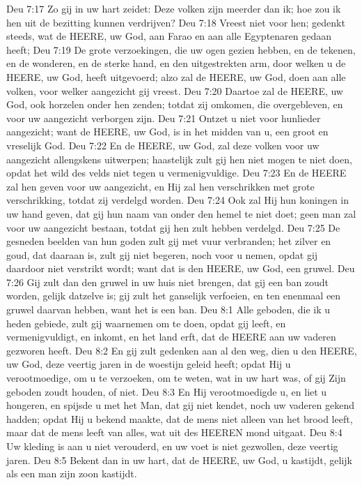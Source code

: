 Deu 7:17  Zo gij in uw hart zeidet: Deze volken zijn meerder dan ik; hoe zou ik hen uit de bezitting kunnen verdrijven?
Deu 7:18  Vreest niet voor hen; gedenkt steeds, wat de HEERE, uw God, aan Farao en aan alle Egyptenaren gedaan heeft;
Deu 7:19  De grote verzoekingen, die uw ogen gezien hebben, en de tekenen, en de wonderen, en de sterke hand, en den uitgestrekten arm, door welken u de HEERE, uw God, heeft uitgevoerd; alzo zal de HEERE, uw God, doen aan alle volken, voor welker aangezicht gij vreest.
Deu 7:20  Daartoe zal de HEERE, uw God, ook horzelen onder hen zenden; totdat zij omkomen, die overgebleven, en voor uw aangezicht verborgen zijn.
Deu 7:21  Ontzet u niet voor hunlieder aangezicht; want de HEERE, uw God, is in het midden van u, een groot en vreselijk God.
Deu 7:22  En de HEERE, uw God, zal deze volken voor uw aangezicht allengskens uitwerpen; haastelijk zult gij hen niet mogen te niet doen, opdat het wild des velds niet tegen u vermenigvuldige.
Deu 7:23  En de HEERE zal hen geven voor uw aangezicht, en Hij zal hen verschrikken met grote verschrikking, totdat zij verdelgd worden.
Deu 7:24  Ook zal Hij hun koningen in uw hand geven, dat gij hun naam van onder den hemel te niet doet; geen man zal voor uw aangezicht bestaan, totdat gij hen zult hebben verdelgd.
Deu 7:25  De gesneden beelden van hun goden zult gij met vuur verbranden; het zilver en goud, dat daaraan is, zult gij niet begeren, noch voor u nemen, opdat gij daardoor niet verstrikt wordt; want dat is den HEERE, uw God, een gruwel.
Deu 7:26  Gij zult dan den gruwel in uw huis niet brengen, dat gij een ban zoudt worden, gelijk datzelve is; gij zult het ganselijk verfoeien, en ten enenmaal een gruwel daarvan hebben, want het is een ban.
Deu 8:1  Alle geboden, die ik u heden gebiede, zult gij waarnemen om te doen, opdat gij leeft, en vermenigvuldigt, en inkomt, en het land erft, dat de HEERE aan uw vaderen gezworen heeft.
Deu 8:2  En gij zult gedenken aan al den weg, dien u den HEERE, uw God, deze veertig jaren in de woestijn geleid heeft; opdat Hij u verootmoedige, om u te verzoeken, om te weten, wat in uw hart was, of gij Zijn geboden zoudt houden, of niet.
Deu 8:3  En Hij verootmoedigde u, en liet u hongeren, en spijsde u met het Man, dat gij niet kendet, noch uw vaderen gekend hadden; opdat Hij u bekend maakte, dat de mens niet alleen van het brood leeft, maar dat de mens leeft van alles, wat uit des HEEREN mond uitgaat.
Deu 8:4  Uw kleding is aan u niet verouderd, en uw voet is niet gezwollen, deze veertig jaren.
Deu 8:5  Bekent dan in uw hart, dat de HEERE, uw God, u kastijdt, gelijk als een man zijn zoon kastijdt.
